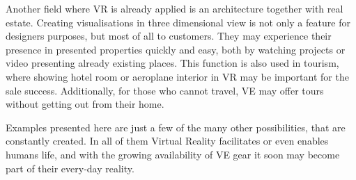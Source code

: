 Another field where VR is already applied is an architecture together with real estate. Creating visualisations in three dimensional view is not only a feature for designers purposes, but most of all to customers. They may experience their presence in presented properties quickly and easy, both by watching projects or video presenting already existing places. This function is also used in tourism, where showing hotel room or aeroplane interior in VR may be important for the sale success. Additionally, for those who cannot travel, VE may offer tours without getting out from their home. \cite{Parisi15, Singal15}


Examples presented here are just a few of the many other possibilities, that are constantly created. In all of them Virtual Reality facilitates or even enables humans life, and with the growing availability of VE gear it soon may become part of their every-day reality.


